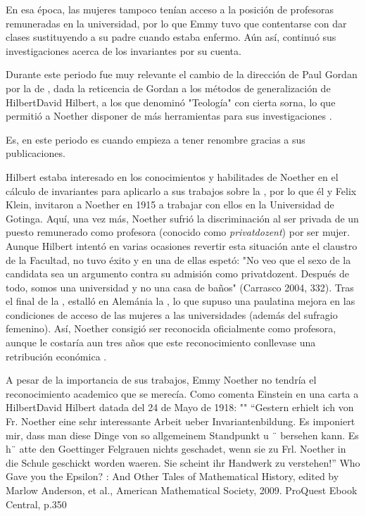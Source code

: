 En esa época, las mujeres tampoco tenían acceso a la posición de profesoras remuneradas en la universidad, por lo que Emmy tuvo que contentarse con dar clases sustituyendo a su padre cuando estaba enfermo. Aún así, continuó sus investigaciones acerca de los invariantes por su cuenta.

Durante este periodo fue muy relevante el cambio de la dirección de Paul Gordan por la de , dada la reticencia de Gordan a los métodos de generalización de {Hilbert}{David Hilbert}, a los que denominó "Teología" con cierta sorna, lo que permitió a Noether disponer de más herramientas para sus investigaciones \citep{Weyl}.

Es, en este periodo es cuando empieza a tener renombre gracias a sus publicaciones.

Hilbert estaba interesado en los conocimientos y habilitades de Noether en el cálculo de invariantes para aplicarlo a sus trabajos sobre la ,
por lo que él y Felix Klein, invitaron a Noether en 1915 a trabajar con ellos en la Universidad de Gotinga. 
Aquí, una vez más, Noether sufrió la discriminación al ser privada de un puesto remunerado como profesora (conocido como \textit{privatdozent}) por ser mujer.
Aunque Hilbert intentó en varias ocasiones revertir esta situación ante el claustro de la Facultad, no tuvo éxito y en una de ellas espetó: "No veo que el sexo de la candidata sea un argumento contra su admisión como privatdozent. Después de todo, somos una universidad y no una casa de baños" (Carrasco 2004, 332).
Tras el final de la , estalló en Alemánia la , lo que supuso una paulatina mejora en las condiciones de acceso de las mujeres a las universidades (además del sufragio femenino).
Así, Noether consigió ser reconocida oficialmente como profesora, aunque le costaría aun tres años que este reconocimiento conllevase una retribución económica \cite[333]{Carrasco}.












A pesar de la importancia de sus trabajos, Emmy Noether no tendría el reconocimiento academico que se merecía. Como comenta Einstein en una carta a {Hilbert}{David Hilbert} datada del 24 de Mayo de 1918:
""
“Gestern erhielt ich von Fr. Noether eine sehr interessante Arbeit ueber Invariantenbildung. Es imponiert mir, dass man diese Dinge von so allgemeinem Standpunkt u ¨ bersehen kann. Es h¨ atte den Goettinger Felgrauen nichts geschadet, wenn sie zu Frl. Noether in die Schule geschickt worden waeren. Sie scheint ihr Handwerk zu verstehen!”
Who Gave you the Epsilon? : And Other Tales of Mathematical History, edited by Marlow Anderson, et al., American Mathematical Society, 2009. ProQuest Ebook Central,
p.350




